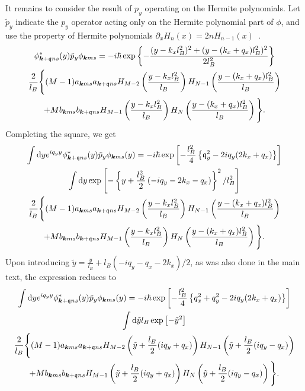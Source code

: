 It remains to consider the result of $p_y$ operating on the Hermite polynomials.
Let $\tilde{p}_y$ indicate the $p_y$ operator acting only on the Hermite polynomial part of $\phi $, and use the property of Hermite polynomials $\partial _x H_n(x) = 2 n H_{n-1}(x)$~\cite[Eq.~18.9.25]{NIST:DLMF}.
\begin{multline}
      \phi ^{*}_{\bm{k}+\mathfrak{q}ns}(y) \tilde{p}_y \phi _{\bm{k}ms} =
    -i \hbar \exp \left\{
      - \frac{(y-k_xl_B^2)^2 + (y-(k_x + q_x) l_B^2)^2}{2 l_B^2}
    \right\}\\
    \frac{2}{l_B}\Bigg\{
      (M-1) a _{\bm{k} ms}a _{\bm{k}+\mathfrak{q} ns} H_{M-2}\left( \frac{y-k_x l_B^2}{l_B} \right) H_{N-1} \left( \frac{y - (k_x+q_x)l_B^2}{l_B} \right)\\
      + M b _{\bm{k} ms} b _{\bm{k}+\mathfrak{q} ns} H_{M-1} \left( \frac{y - k_xl_B^2}{l_B} \right) H_N \left( \frac{y - (k_x+q_x)l_B^2}{l_B} \right)
    \Bigg\}.
\end{multline}
Completing the square, we get
\begin{multline}
  \int \mathrm{d}y e^{iq_y y} \phi ^{*}_{\bm{k}+\mathfrak{q} ns}(y) \tilde{p}_y \phi _{\bm{k} ms}(y) =
  -i\hbar
  \exp \left[ -\frac{l_B^2}{4} \left\{ \mathfrak{q}_y^2 - 2iq_y ( 2k_x + q_x) \right\} \right]\\
  \int \mathrm{d}y
  \exp \left[
    - \left\{
      y + \frac{l_B^2}{2} \left( -iq_y - 2k_x - q_x \right)
    \right\} ^2
    / l_B^2
  \right]\\
  \frac{2}{l_B}\Bigg\{
  (M-1) a _{\bm{k}ms}a _{\bm{k}+\mathfrak{q} ns} H_{M-2}\left( \frac{y-k_x l_B^2}{l_B} \right) H_{N-1} \left( \frac{y - (k_x+q_x)l_B^2}{l_B} \right)\\
  + M b _{\bm{k} ms} b _{\bm{k}+\mathfrak{q} ns} H_{M-1} \left( \frac{y - k_xl_B^2}{l_B} \right) H_N \left( \frac{y - (k_x+q_x)l_B^2}{l_B} \right)
  \Bigg\}.
\end{multline}
Upon introducing $\tilde{y} = \frac{y}{l_B} + l_B( -iq_y - q_x - 2k_x) / 2$, as was also done in the main text, the expression reduces to
\begin{multline}
  \int \mathrm{d}y e^{iq_y y} \phi ^{*}_{\bm{k}+\mathfrak{q} ns}(y) \tilde{p}_y \phi _{\bm{k} ms}(y) =
  -i\hbar
  \exp \left[ -\frac{l_B^2}{4} \left\{ q_x^2 + q_y^2 - 2iq_y ( 2k_x + q_x) \right\} \right]\\
  \int \mathrm{d}\tilde{y} l_B
  \exp \left[
    - \tilde{y}^2
  \right]\\
  \frac{2}{l_B}\Bigg\{
  (M-1) a _{\bm{k}ms}a _{\bm{k}+\mathfrak{q} ns}
  H_{M-2}\left( \tilde{y} + \frac{l_B}{2}(iq_y + q_x) \right)
  H_{N-1} \left( \tilde{y} + \frac{l_B}{2}(iq_y - q_x) \right)\\
  + M b _{\bm{k} ms} b _{\bm{k}+\mathfrak{q} ns}
  H_{M-1} \left( \tilde{y} + \frac{l_B}{2}(iq_y + q_x)\right)
  H_N \left( \tilde{y} + \frac{l_B}{2}(iq_y - q_x) \right)
  \Bigg\}.
\end{multline}

